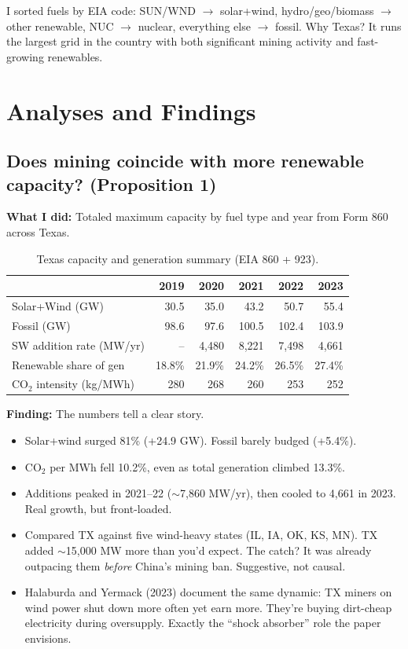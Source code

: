 \documentclass[11pt, letterpaper]{article}
\begin{document}
I sorted fuels by EIA code: SUN/WND $\to$ solar+wind, hydro/geo/biomass $\to$ other renewable, NUC $\to$ nuclear, everything else $\to$ fossil. Why Texas? It runs the largest grid in the country with both significant mining activity and fast-growing renewables.


\section{Analyses and Findings}

\subsection{Does mining coincide with more renewable capacity? (Proposition 1)}

\textbf{What I did:} Totaled maximum capacity by fuel type and year from Form 860 across Texas.

\begin{table}[H]
\centering\small
\begin{tabular}{@{}lrrrrr@{}}
\toprule
& 2019 & 2020 & 2021 & 2022 & 2023 \\
\midrule
Solar+Wind (GW) & 30.5 & 35.0 & 43.2 & 50.7 & 55.4 \\
Fossil (GW) & 98.6 & 97.6 & 100.5 & 102.4 & 103.9 \\
SW addition rate (MW/yr) & -- & 4,480 & 8,221 & 7,498 & 4,661 \\
Renewable share of gen & 18.8\% & 21.9\% & 24.2\% & 26.5\% & 27.4\% \\
CO$_2$ intensity (kg/MWh) & 280 & 268 & 260 & 253 & 252 \\
\bottomrule
\end{tabular}
\caption{Texas capacity and generation summary (EIA 860 + 923).}
\end{table}

\textbf{Finding:} The numbers tell a clear story.
\begin{itemize}
\item Solar+wind surged 81\% (+24.9 GW). Fossil barely budged (+5.4\%).
\item CO$_2$ per MWh fell 10.2\%, even as total generation climbed 13.3\%.
\item Additions peaked in 2021--22 ($\sim$7,860 MW/yr), then cooled to 4,661 in 2023. Real growth, but front-loaded.
\item Compared TX against five wind-heavy states (IL, IA, OK, KS, MN). TX added $\sim$15,000 MW more than you'd expect. The catch? It was already outpacing them \textit{before} China's mining ban. Suggestive, not causal.
\item Halaburda and Yermack (2023) document the same dynamic: TX miners on wind power shut down more often yet earn more. They're buying dirt-cheap electricity during oversupply. Exactly the ``shock absorber'' role the paper envisions.
\end{itemize}
\end{document}

